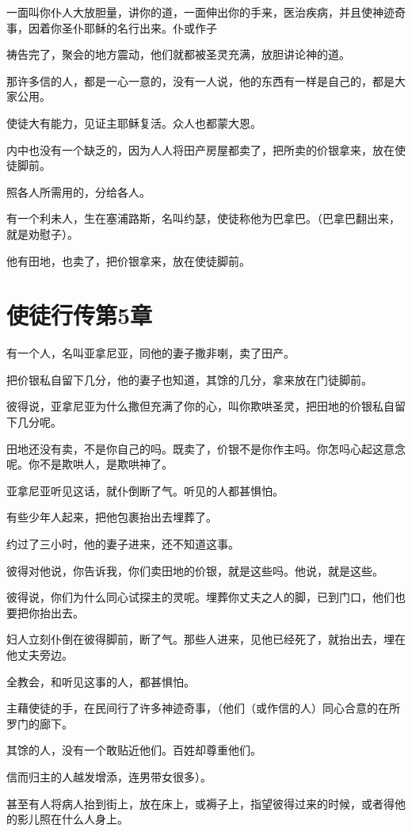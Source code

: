 \documentclass[12pt,oneside]{book}
\begin{document}
一面叫你仆人大放胆量，讲你的道，一面伸出你的手来，医治疾病，并且使神迹奇事，因着你圣仆耶稣的名行出来。仆或作子

祷告完了，聚会的地方震动，他们就都被圣灵充满，放胆讲论神的道。

那许多信的人，都是一心一意的，没有一人说，他的东西有一样是自己的，都是大家公用。

使徒大有能力，见证主耶稣复活。众人也都蒙大恩。

内中也没有一个缺乏的，因为人人将田产房屋都卖了，把所卖的价银拿来，放在使徒脚前。

照各人所需用的，分给各人。

有一个利未人，生在塞浦路斯，名叫约瑟，使徒称他为巴拿巴。（巴拿巴翻出来，就是劝慰子）。

他有田地，也卖了，把价银拿来，放在使徒脚前。

\chapter{使徒行传第5章}
有一个人，名叫亚拿尼亚，同他的妻子撒非喇，卖了田产。

把价银私自留下几分，他的妻子也知道，其馀的几分，拿来放在门徒脚前。

彼得说，亚拿尼亚为什么撒但充满了你的心，叫你欺哄圣灵，把田地的价银私自留下几分呢。

田地还没有卖，不是你自己的吗。既卖了，价银不是你作主吗。你怎吗心起这意念呢。你不是欺哄人，是欺哄神了。

亚拿尼亚听见这话，就仆倒断了气。听见的人都甚惧怕。

有些少年人起来，把他包裹抬出去埋葬了。

约过了三小时，他的妻子进来，还不知道这事。

彼得对他说，你告诉我，你们卖田地的价银，就是这些吗。他说，就是这些。

彼得说，你们为什么同心试探主的灵呢。埋葬你丈夫之人的脚，已到门口，他们也要把你抬出去。

妇人立刻仆倒在彼得脚前，断了气。那些人进来，见他已经死了，就抬出去，埋在他丈夫旁边。

全教会，和听见这事的人，都甚惧怕。

主藉使徒的手，在民间行了许多神迹奇事，（他们（或作信的人）同心合意的在所罗门的廊下。

其馀的人，没有一个敢贴近他们。百姓却尊重他们。

信而归主的人越发增添，连男带女很多）。

甚至有人将病人抬到街上，放在床上，或褥子上，指望彼得过来的时候，或者得他的影儿照在什么人身上。
\end{document}
